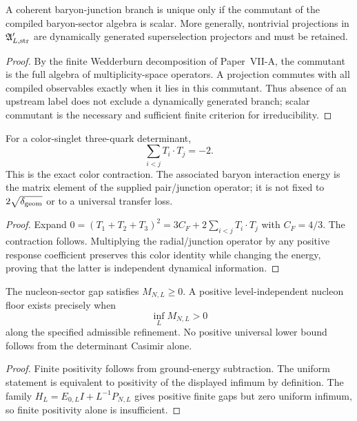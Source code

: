\documentclass[12pt,a4paper]{article}
\providecommand{\deltageom}{\delta_{\rm geom}}
\begin{document}
\begin{lemma}
\label{p11:lem:no-incoherent-baryon-junction-branch}

A coherent baryon-junction branch is unique only if the commutant of the compiled baryon-sector algebra is scalar.  More generally, nontrivial projections in \(\mathfrak A'_{L,{\rm str}}\) are dynamically generated superselection projectors and must be retained.

\end{lemma}
\begin{proof}

By the finite Wedderburn decomposition of Paper~VII-A, the commutant is the full algebra of multiplicity-space operators.  A projection commutes with all compiled observables exactly when it lies in this commutant.  Thus absence of an upstream label does not exclude a dynamically generated branch; scalar commutant is the necessary and sufficient finite criterion for irreducibility.
\end{proof}

\begin{theorem}
\label{p11:thm:baryon-flux-junction-contraction}

For a color-singlet three-quark determinant,
\[
\sum_{i<j}T_i\!\cdot T_j=-2.
\]
This is the exact color contraction.  The associated baryon interaction energy is the matrix element of the supplied pair/junction operator; it is not fixed to \(2\sqrt{\deltageom}\) or to a universal transfer loss.
\label{p11:eq:coherent-baryon-junction-loss}
\end{theorem}
\begin{proof}

Expand \(0=(T_1+T_2+T_3)^2=3C_F+2\sum_{i<j}T_i\cdot T_j\) with \(C_F=4/3\).  The contraction follows.  Multiplying the radial/junction operator by any positive response coefficient preserves this color identity while changing the energy, proving that the latter is independent dynamical information.
\end{proof}

\begin{theorem}
\label{p11:thm:positive-native-nucleon-mass-floor}

The nucleon-sector gap satisfies \(M_{N,L}\ge0\).  A positive level-independent nucleon floor exists precisely when
\[
\inf_L M_{N,L}>0
\]
along the specified admissible refinement.  No positive universal lower bound follows from the determinant Casimir alone.
\label{p11:eq:positive-native-nucleon-mass-floor}
\end{theorem}
\begin{proof}

Finite positivity follows from ground-energy subtraction.  The uniform statement is equivalent to positivity of the displayed infimum by definition.  The family \(H_L=E_{0,L}I+L^{-1}P_{N,L}\) gives positive finite gaps but zero uniform infimum, so finite positivity alone is insufficient.
\end{proof}
\end{document}

